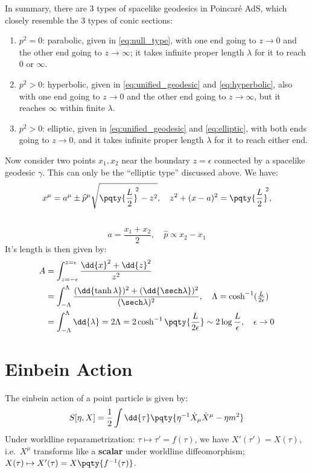 \documentclass[a4paper,10pt]{article}
\begin{document}
	In summary, there are 3 types of spacelike geodesics in Poincar\'e AdS, which closely resemble the 3 types of conic sections:
	\begin{enumerate}
	\item $p^2 = 0$: parabolic, given in \eqref{eq:null_type}, with one end going to $z\to 0$ and the other end going to $z\to\infty$; it takes infinite proper length $\lambda$ for it to reach $0$ or $\infty$. 
	\item $p^2 > 0$: hyperbolic, given in \eqref{eq:unified_geodesic} and \eqref{eq:hyperbolic}, also with one end going to $z\to 0$ and the other end going to $z\to\infty$, but it reaches $\infty$ within finite $\lambda$. 
	\item $p^2 > 0$: elliptic, given in \eqref{eq:unified_geodesic} and \eqref{eq:elliptic}, with both ends going to $z\to 0$, and it takes infinite proper length $\lambda$ for it to reach either end. 
	\end{enumerate}
	
	Now consider two points $x_1,x_2$ near the boundary $z = \epsilon$ connected by a spacelike geodesic $\gamma$. This can only be the ``elliptic type'' discussed above. We have:
	\begin{equation}
		x^\mu
		= a^\mu \pm \widehat{p}^\mu
			\sqrt{\pqty{\frac{L}{2}}^{\!\!2} - z^2},
	\quad
		z^2 + (x - a)^2
		= \pqty{\frac{L}{2}}^{\!\!2},
	\end{equation}
	\\[-1.5\baselineskip]
	\begin{equation}
		a = \frac{x_1 + x_2}{2},
	\quad
		\widehat{p} \propto x_2 - x_1
	\end{equation}
	It's length is then given by:
	\begin{equation}
	\begin{aligned}
		A
		&= \int_{z=-\epsilon}^{z=\epsilon}
			\frac{\dd{x}^2 + \dd{z}^2}{z^2} \\
		&= \int_{-\Lambda}^{\Lambda}
			\frac{
				(\dd{\tanh\lambda})^2
				+ (\dd{\sech\lambda})^2
			}{(\sech\lambda)^2},
		\quad \Lambda
			= \cosh^{-1} (\tfrac{L}{2\epsilon}) \\
		&= \int_{-\Lambda}^{\Lambda}
			\dd{\lambda}
		= 2\Lambda
		= 2\cosh^{-1} \pqty{\frac{L}{2\epsilon}}
		\sim 2\log \frac{L}{\epsilon},
	\quad \epsilon \to 0
	\end{aligned}
	\end{equation}

\section{Einbein Action}
	The einbein action of a point particle is given by:
	\begin{equation}
		S[\eta,X] = \frac{1}{2} \int \dd{\tau} \pqty{
				\eta^{-1} \dot{X}_\mu \dot{X}^\mu
				- \eta m^2
			}
	\end{equation}
	Under worldline reparametrization: $\tau \mapsto \tau' = f(\tau)$, we have $X'(\tau') = X(\tau)$, i.e.~$X^\mu$ transforms like a \textbf{scalar} under worldline diffeomorphism; $
		X(\tau)
		\mapsto X'(\tau)
		= X\pqty{f^{-1}(\tau)}
	$. 
	
\end{document}

